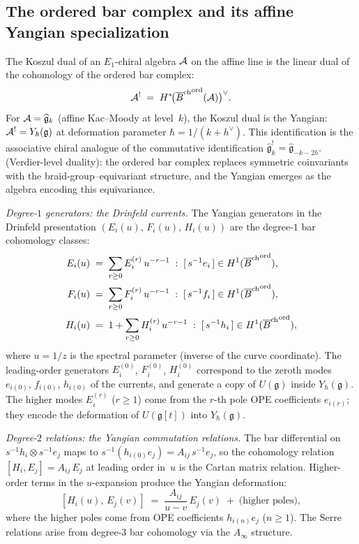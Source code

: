 \subsection{The ordered bar complex and its affine Yangian specialization}

\begin{construction}
The Koszul dual of an $E_1$-chiral algebra $\mathcal{A}$ on the
affine line is the linear dual of the cohomology of the
ordered bar complex:
\[
\mathcal{A}^!
\;=\;
H^*\!\bigl({\overline{B}^{\mathrm{ch}}}^{\mathrm{ord}}(\mathcal{A})\bigr)^\vee.
\]
For $\mathcal{A}=\widehat{\mathfrak g}_k$ (affine Kac--Moody at
level~$k$), the Koszul dual is the Yangian:
$\mathcal{A}^!=Y_\hbar(\mathfrak g)$ at deformation parameter
$\hbar=1/(k+h^\vee)$. This identification is the
associative chiral analogue of the commutative identification
$\widehat{\mathfrak g}_k^!=\widehat{\mathfrak g}_{-k-2h^\vee}$
(Verdier-level duality): the ordered bar complex replaces
symmetric coinvariants with the braid-group--equivariant
structure, and the Yangian emerges as the algebra encoding
this equivariance.

\emph{Degree-$1$ generators: the Drinfeld currents.}
The Yangian generators in the Drinfeld presentation
$(E_i(u),\,F_i(u),\,H_i(u))$ are the degree-$1$ bar
cohomology classes:
\begin{align*}
E_i(u)&\;=\;\sum_{r\ge 0}E_i^{(r)}\,u^{-r-1}
\;:\;
[\,s^{-1}e_i\,]\in H^1({\overline{B}^{\mathrm{ch}}}^{\mathrm{ord}}),\\
F_i(u)&\;=\;\sum_{r\ge 0}F_i^{(r)}\,u^{-r-1}
\;:\;
[\,s^{-1}f_i\,]\in H^1({\overline{B}^{\mathrm{ch}}}^{\mathrm{ord}}),\\
H_i(u)&\;=\;1+\sum_{r\ge 0}H_i^{(r)}\,u^{-r-1}
\;:\;
[\,s^{-1}h_i\,]\in H^1({\overline{B}^{\mathrm{ch}}}^{\mathrm{ord}}),
\end{align*}
where $u=1/z$ is the spectral parameter (inverse of the
curve coordinate). The leading-order generators
$E_i^{(0)}$, $F_i^{(0)}$, $H_i^{(0)}$ correspond to the
zeroth modes $e_{i(0)}$, $f_{i(0)}$, $h_{i(0)}$ of the
currents, and generate a copy of $U(\mathfrak g)$ inside
$Y_\hbar(\mathfrak g)$. The higher modes $E_i^{(r)}$
($r\ge 1$) come from the $r$-th pole OPE coefficients
$e_{i(r)}$; they encode the deformation of
$U(\mathfrak g[t])$ into $Y_\hbar(\mathfrak g)$.

\emph{Degree-$2$ relations: the Yangian commutation
relations.}
The bar differential on
$s^{-1}h_i\otimes s^{-1}e_j$ maps to $s^{-1}(h_{i(0)}e_j)
=A_{ij}\,s^{-1}e_j$, so the cohomology relation
$[H_i,E_j]=A_{ij}\,E_j$ at leading order in~$u$ is
the Cartan matrix relation. Higher-order terms in the
$u$-expansion produce the Yangian deformation:
\[
[H_i(u),\,E_j(v)]
\;=\;
\frac{A_{ij}}{u-v}\,E_j(v)
\;+\;\text{(higher poles)},
\]
where the higher poles come from OPE coefficients
$h_{i(n)}e_j$ ($n\ge 1$). The Serre relations arise from
degree-$3$ bar cohomology via the $A_\infty$ structure.


\end{construction}

